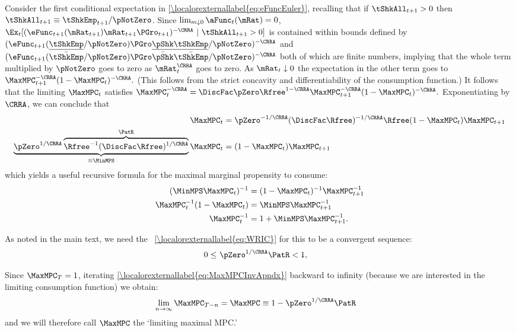 \documentclass[\econtexRoot/BufferStockTheory.tex]{subfiles}
\begin{document}
Consider the first conditional expectation in \eqref{\localorexternallabel{eq:eFuncEuler}},
recalling that if $\tShkAll_{t+1}>0$ then $\tShkAll_{t+1} \equiv
\tShkEmp_{t+1}/\pNotZero$.  Since $\lim_{m \downarrow 0}
\aFunc_{t}(\mRat) = 0$,
$\Ex_{t}[(\eFunc_{t+1}(\mRat_{t+1})\mRat_{t+1}\PGro_{t+1})^{-\CRRA}~|~\tShkAll_{t+1}>0]$
is contained within bounds defined by
$(\eFunc_{t+1}(\ushort{\tShkEmp}/\pNotZero) \PGro\ushort{\pShk}
\ushort{\tShkEmp}/\pNotZero)^{-\CRRA}$ and
$(\eFunc_{t+1}(\bar{\tShkEmp}/\pNotZero) \PGro\bar{\pShk}
\bar{\tShkEmp}/\pNotZero)^{-\CRRA}$ both of which are finite numbers,
implying that the whole term multiplied by $\pNotZero$ goes to zero as
$\mRat_{t}^{\CRRA}$ goes to zero.  As $\mRat_{t} \downarrow 0$ the
expectation in the other term goes to $\MaxMPC _{t+1}^{-\CRRA
}(1-\MaxMPC _{t})^{-\CRRA }.$ (This follows from the strict concavity
and differentiability of the consumption function.) It follows that
the limiting $\MaxMPC_{t}$ satisfies $\MaxMPC_{t}^{-\CRRA }=\DiscFac
\pZero\Rfree^{1-\CRRA }\MaxMPC_{t+1}^{-\CRRA }(1-\MaxMPC
_{t})^{-\CRRA }.$ Exponentiating by $\CRRA$, we can conclude that
\begin{align}
\MaxMPC_{t} & = \pZero^{-1/\CRRA} (\DiscFac
\Rfree)^{-1/\CRRA}\Rfree(1-\MaxMPC _{t})\MaxMPC _{t+1} \notag
\\ \underbrace{\pZero^{1/\CRRA}\overbrace{{\Rfree}^{-1}(\DiscFac
    \Rfree)^{1/\CRRA}}^{\PatR}}_{\equiv \MinMPS}
\MaxMPC_{t} & = (1-\MaxMPC _{t})\MaxMPC _{t+1} \label{eq:MinMPSDef}
\end{align}
which yields a useful recursive formula for the maximal marginal propensity to consume:
\begin{align}
  (\MinMPS \MaxMPC_{t})^{-1}  & = (1-\MaxMPC_{t})^{-1}\MaxMPC_{t+1}^{-1}  \notag
\\ \MaxMPC_{t}^{-1}(1-\MaxMPC_{t})  & = \MinMPS \MaxMPC_{t+1}^{-1}   \notag
\\ \MaxMPC_{t}^{-1}  & = 1+\MinMPS \MaxMPC_{t+1}^{-1} \label{eq:MaxMPCInvApndx}.
\end{align}

As noted in the main text, we need the \WRIC~\eqref{\localorexternallabel{eq:WRIC}} for this to be a convergent sequence:
\begin{align}
  0 \leq & ~\pZero^{1/\CRRA} \PatR < 1 \label{eq:WRICapndx},
\end{align}

Since $\MaxMPC_{T}=1$, iterating \eqref{\localorexternallabel{eq:MaxMPCInvApndx}} backward to
infinity (because we are interested in the limiting consumption function) we obtain:
\begin{align}
\lim_{n\rightarrow\infty}\MaxMPC_{T-n} 
& = \MaxMPC \equiv 1-\pZero^{1/\CRRA}\PatR  \label{eq:MaxMPCDef}
\end{align}
and we will therefore call $\MaxMPC$ the `limiting maximal MPC.'
\end{document}
